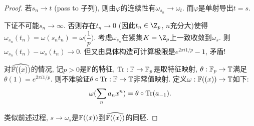 \begin{proof}
    若$s_n \to t$ (pass to 子列), 则由$\varphi$的连续性有$\omega_{s_n} \to \omega_t$. 而$\varphi$是单射导出$t = s$.

    下证不可能$s_n \to \infty$. 否则存在$t_n \to 0$ (因此$t_n \in \Z_p$, $n$充分大)使得$\omega_{s_n}(t_n) = \omega(s_nt_n) = \omega\Big(\dfrac{1}{p}\Big)$. 
    考虑$\omega_{s_n}$在紧集$K = \Z_p$上一致收敛到$\omega_s$. 
    则$\omega_{s_n}(t_n) - \omega_s(t_n) \to 0$. 
    但又由具体构造可计算极限是$e^{2\pi i 1/p} - 1$, 矛盾!

    对$\widehat{\mathbb{F}((x))}$的情况, 记$p > 0$是$\mathbb{F}$的特征, 
    $\operatorname{Tr}:\mathbb{F} \to \mathbb{F}_p$是取特征映射, $\theta:\mathbb{F}_p \to \mathbb{T}$满足$\theta(1) = e^{2\pi i 1/p}$. 
    则不难验证$\theta \circ \operatorname{Tr}:\mathbb{F} \to \mathbb{T}$非常值映射. 定义$\omega:\mathbb{F}((x)) \to \mathbb{T}$如下:
    \[\omega(\sum_n a_nx^n) = \theta \circ \operatorname{Tr}(a_{-1}).\]

    类似前述过程, $s \to \omega_s$是$\mathbb{F}((x))$到$\widehat{\mathbb{F}((x))}$的同胚.
\end{proof}

